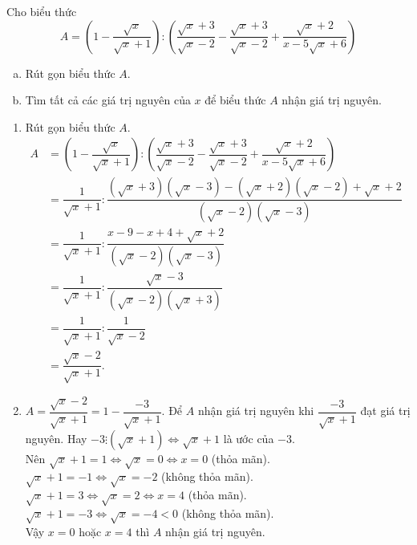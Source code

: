 \begin{bt}%
	Cho biểu thức $$A=\left(1-\dfrac{\sqrt{x}}{\sqrt{x}+1}\right):\left(\dfrac{\sqrt{x}+3}{\sqrt{x}-2}-\dfrac{\sqrt{x}+3}{\sqrt{x}-2}+\dfrac{\sqrt{x}+2}{x-5\sqrt{x}+6}\right)$$
	\begin{enumerate}[a)]
		\item Rút gọn biểu thức $A$.
		\item Tìm tất cả các giá trị nguyên của $x$ để biểu thức $A$ nhận giá trị nguyên.
	\end{enumerate}
	\loigiai
	{\hfill
		\begin{enumerate}
			\item Rút gọn biểu thức $A$.\\
			$\begin{aligned}
			A&=\left(1-\dfrac{\sqrt{x}}{\sqrt{x}+1}\right):\left(\dfrac{\sqrt{x}+3}{\sqrt{x}-2}-\dfrac{\sqrt{x}+3}{\sqrt{x}-2}+\dfrac{\sqrt{x}+2}{x-5\sqrt{x}+6}\right)\\
			&=\dfrac{1}{\sqrt{x}+1}:\dfrac{(\sqrt{x}+3)(\sqrt{x}-3)-(\sqrt{x}+2)(\sqrt{x}-2)+\sqrt{x}+2}{(\sqrt{x}-2)(\sqrt{x}-3)}\\
			&=\dfrac{1}{\sqrt{x}+1}:\dfrac{x-9-x+4+\sqrt{x}+2}{(\sqrt{x}-2)(\sqrt{x}-3)}\\
			&=\dfrac{1}{\sqrt{x}+1}:\dfrac{\sqrt{x}-3}{(\sqrt{x}-2)(\sqrt{x}+3)}\\
			&=\dfrac{1}{\sqrt{x}+1}:\dfrac{1}{\sqrt{x}-2}\\
			&=\dfrac{\sqrt{x}-2}{\sqrt{x}+1}.
			\end{aligned}$
			\item $A=\dfrac{\sqrt{x}-2}{\sqrt{x}+1}=1-\dfrac{-3}{\sqrt{x}+1}$. Để $A$ nhận giá trị nguyên khi $\dfrac{-3}{\sqrt{x}+1}$ đạt giá trị nguyên. Hay $-3\vdots(\sqrt{x}+1)\Leftrightarrow \sqrt{x}+1$ là ước của $-3$.\\
			Nên $\sqrt{x}+1=1\Leftrightarrow \sqrt{x}=0\Leftrightarrow x=0$ (thỏa mãn).\\
			$\sqrt{x}+1=-1\Leftrightarrow \sqrt{x}=-2$ (không thỏa mãn).\\
			$\sqrt{x}+1=3\Leftrightarrow \sqrt{x}=2\Leftrightarrow x=4$ (thỏa mãn).\\
			$\sqrt{x}+1=-3\Leftrightarrow \sqrt{x}=-4<0$ (không thỏa mãn).\\
			Vậy $x=0$ hoặc $x=4$ thì $A$ nhận giá trị nguyên.
		\end{enumerate}
	}
\end{bt}

